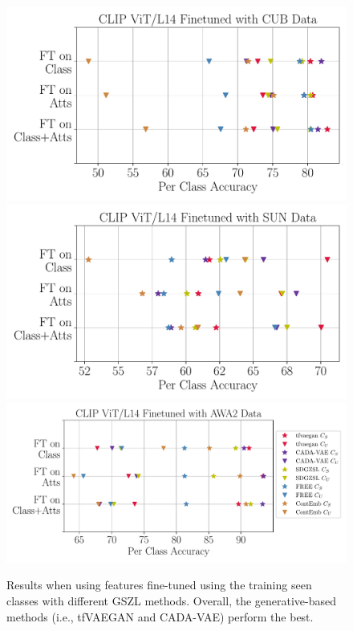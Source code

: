 

\begin{figure}[h]
\centering
\includegraphics[width=.3\textwidth]{Images/gzsl_results_w_clip_finetuned_cub.pdf}\hfill
\includegraphics[width=.3\textwidth]{Images/gzsl_results_w_clip_finetuned_sun.pdf}\hfill
\includegraphics[width=.37\textwidth]{Images/gzsl_results_w_clip_finetuned_awa2.pdf}
\caption{Results when using features fine-tuned using the training seen classes with different GSZL methods. Overall, the generative-based methods (i.e., tfVAEGAN\cite{tfvaegan} and CADA-VAE\cite{CADA_VAE}) perform the best.}
\label{fig:finetuned_features_res}
\end{figure}


